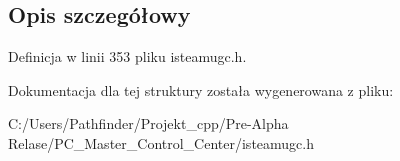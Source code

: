 \subsection{Opis szczegółowy}


Definicja w linii 353 pliku isteamugc.\+h.



Dokumentacja dla tej struktury została wygenerowana z pliku\+:\begin{DoxyCompactItemize}
\item 
C\+:/\+Users/\+Pathfinder/\+Projekt\+\_\+cpp/\+Pre-\/\+Alpha Relase/\+P\+C\+\_\+\+Master\+\_\+\+Control\+\_\+\+Center/isteamugc.\+h\end{DoxyCompactItemize}
